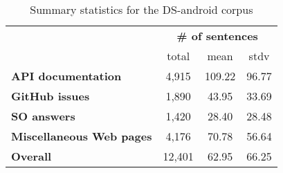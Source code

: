 \begin{table}[!h]
\centering    
\begin{scriptsize}
\begin{threeparttable}
\begin{tabular}{lccc}





& \multicolumn{3}{c}{\textbf{\# of sentences}}
\\ \cmidrule(l){2-4} 
& total & mean & stdv  \\

\hline
\hline

\textbf{API documentation} 
& 4,915 & 109.22 & 96.77
\\
\textbf{GitHub issues} 
& 1,890 &  43.95 & 33.69
\\
\textbf{SO answers} 
& 1,420 & 28.40 & 28.48 
\\
\textbf{Miscellaneous Web pages} 
& 4,176 & 70.78 & 56.64 
\\

\hline
\hline
\textbf{Overall} 
& 12,401 & 62.95 & 66.25 
\\
\hline

\end{tabular}
\end{threeparttable}
\end{scriptsize}
\caption{Summary statistics for the \acs{DS-android} corpus}
\label{tbl:corpus-summary}
\end{table}

